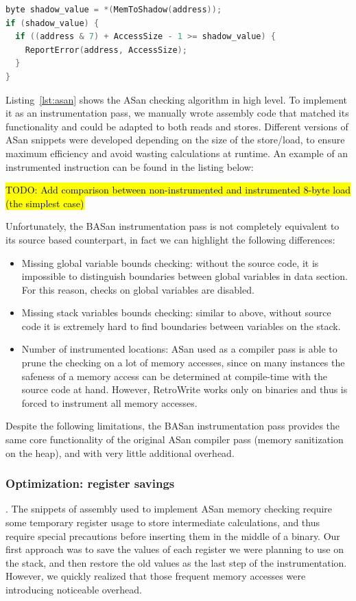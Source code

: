 \documentclass[a4paper,11pt,oneside]{report}
\newcommand{\sysname}{RetroWrite\xspace}
\DeclareRobustCommand{\todo}[1]{{\sethlcolor{cyan}\hl{TODO: #1}}}
\begin{document}
\begin{lstlisting}[float,floatplacement=H,language=C,label={lst:asan},caption={ASan checking algorithm 
implemented in C}]
byte shadow_value = *(MemToShadow(address));
if (shadow_value) {
  if ((address & 7) + AccessSize - 1 >= shadow_value) {
	ReportError(address, AccessSize);
  }
}
\end{lstlisting}

Listing~\ref{lst:asan} shows the ASan checking algorithm in high level. To 
implement it as an instrumentation pass, we manually wrote assembly code that 
matched its functionality and could be adapted to both reads and stores.  
Different versions of ASan snippets were developed depending on the size of the 
store/load, to ensure maximum efficiency and avoid wasting calculations at 
runtime. An example of an instrumented instruction can be found in the listing 
below:

\todo{Add comparison between non-instrumented and instrumented 8-byte load (the 
simplest case)}

Unfortunately, the BASan instrumentation pass is not completely equivalent to 
its source based counterpart, in fact we can highlight the following 
differences:
\begin{itemize}
	\item Missing global variable bounds checking: without the source code, it 
		is impossible to distinguish boundaries between global variables in 
		data section. For this reason, checks on global variables are disabled.
	\item Missing stack variables bounds checking: similar to above, without 
		source code it is extremely hard to find boundaries between variables 
		on the stack.
	\item Number of instrumented locations: ASan used as a compiler pass is 
		able to prune the checking on a lot of memory accesses, since on many 
		instances the safeness of a memory access can be determined at 
		compile-time with the source code at hand. However, \sysname works only 
		on binaries and thus is forced to instrument all memory accesses.
\end{itemize}
Despite the following limitations, the BASan instrumentation pass provides the 
same core functionality of the original ASan compiler pass (memory sanitization 
on the heap), and with very little additional overhead.

\subsubsection{Optimization: register savings}.
The snippets of assembly used to implement ASan memory checking require some 
temporary register usage to store intermediate calculations, and thus require 
special precautions before inserting them in the middle of a binary. Our first 
approach was to save the values of each register we were planning to use on the 
stack, and then restore the old values as the last step of the instrumentation.  
However, we quickly realized that those frequent memory accesses were 
introducing noticeable overhead. 
\end{document}
